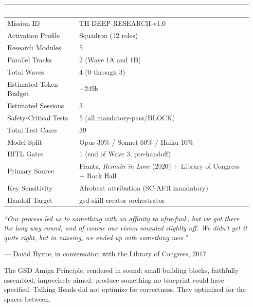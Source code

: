\documentclass[11pt,letterpaper]{article}
\newcommand{\tableheader}[1]{\textbf{\sffamily\textcolor{white}{#1}}}
\begin{document}
\begin{center}
\begin{tabularx}{\textwidth}{L{5cm}X}
\toprule
{}
\tableheader{Metric} & \tableheader{Value} \\
\midrule
Mission ID & TH-DEEP-RESEARCH-v1.0 \\
Activation Profile & Squadron (12 roles) \\
Research Modules & 5 \\
Parallel Tracks & 2 (Wave 1A and 1B) \\
Total Waves & 4 (0 through 3) \\
Estimated Token Budget & $\sim$249k \\
Estimated Sessions & 3 \\
Safety-Critical Tests & 5 (all mandatory-pass/BLOCK) \\
Total Test Cases & 39 \\
Model Split & Opus 30\% / Sonnet 60\% / Haiku 10\% \\
HITL Gates & 1 (end of Wave 3, pre-handoff) \\
Primary Source & Frantz, \textit{Remain in Love} (2020) + Library of Congress + Rock Hall \\
Key Sensitivity & Afrobeat attribution (SC-AFR mandatory) \\
Handoff Target & gsd-skill-creator orchestrator \\
\bottomrule
\end{tabularx}
\end{center}

\vspace{2em}

\begin{quotebox}
\itshape\sffamily
``Our process led us to something with an affinity to afro-funk, but we got there the long way round, and of course our vision sounded slightly off. We didn't get it quite right, but in missing, we ended up with something new.''

\vspace{0.5em}
\hfill --- David Byrne, in conversation with the Library of Congress, 2017

\vspace{1em}
\normalfont\sffamily\small
The GSD Amiga Principle, rendered in sound: small building blocks, faithfully assembled, imprecisely aimed, produce something no blueprint could have specified. Talking Heads did not optimize for correctness. They optimized for the spaces between.
\end{quotebox}
\end{document}
